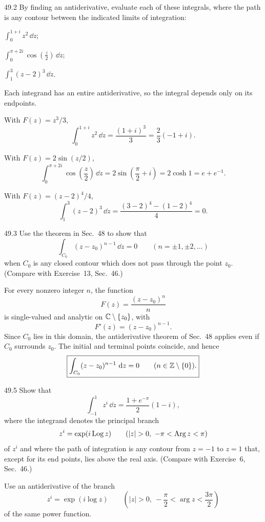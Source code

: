 \documentclass[11pt,oneside]{article}
\begin{document}
\begin{exercise}{49.2}
By finding an antiderivative, evaluate each of these integrals, where the path is any contour between the indicated limits of integration:
\begin{exercisesubparts}
\item $\displaystyle\int_0^{1+i}z^2\,\dd z$;
\item $\displaystyle\int_0^{\pi+2i}\cos\left(\frac z2\right)\,\dd z$;
\item $\displaystyle\int_1^3(z-2)^3\,\dd z$.
\end{exercisesubparts}
\end{exercise}

\begin{solution}
Each integrand has an entire antiderivative, so the integral depends only on its endpoints.
\begin{exercisesubparts}
\item With $F(z)=z^3/3$,
\[
    \int_0^{1+i}z^2\,\dd z=\frac{(1+i)^3}{3}
    =\boxed{\frac23(-1+i)}.
\]
\item With $F(z)=2\sin(z/2)$,
\[
    \int_0^{\pi+2i}\cos\left(\frac z2\right)\,\dd z
    =2\sin\left(\frac\pi2+i\right)=2\cosh1
    =\boxed{e+e^{-1}}.
\]
\item With $F(z)=(z-2)^4/4$,
\[
    \int_1^3(z-2)^3\,\dd z
    =\frac{(3-2)^4-(1-2)^4}{4}=\boxed{0}.
\]
\end{exercisesubparts}
\end{solution}

\begin{exercise}{49.3}
Use the theorem in Sec.~48 to show that
\[
    \int_{C_0}(z-z_0)^{n-1}\,\dd z=0\qquad(n=\pm1, \pm2, \ldots)
\]
when $C_0$ is any closed contour which does not pass through the point $z_0$. (Compare with Exercise~13, Sec.~46.)
\end{exercise}

\begin{solution}
For every nonzero integer $n$, the function
\[
    F(z)=\frac{(z-z_0)^n}{n}
\]
is single-valued and analytic on $\mathbb{C}\setminus\{z_0\}$, with
\[
    F'(z)=(z-z_0)^{n-1}.
\]
Since $C_0$ lies in this domain, the antiderivative theorem of Sec.~48 applies even if $C_0$ surrounds $z_0$. The initial and terminal points coincide, and hence
\[
    \boxed{\int_{C_0}(z-z_0)^{n-1}\,\mathop{}\!\mathrm{d} z=0\qquad(n\in\mathbb{Z}\setminus\{0\}).}
\]
\end{solution}

\begin{exercise}{49.5}
Show that
\[
    \int_{-1}^{1}z^i\,\dd z=\frac{1+e^{-\pi}}{2}(1-i),
\]
where the integrand denotes the principal branch
\[
    z^i=\exp(i\Log z)\qquad(|z|>0, \ -\pi<\Arg z<\pi)
\]
of $z^i$ and where the path of integration is any contour from $z=-1$ to $z=1$ that, except for its end points, lies above the real axis. (Compare with Exercise~6, Sec.~46.)
\begin{suggestion}
Use an antiderivative of the branch
\[
    z^i=\exp(i\log z)\qquad\left(|z|>0, \ -\frac\pi2<\arg z<\frac{3\pi}{2}\right)
\]
of the same power function.
\end{suggestion}
\end{exercise}
\end{document}

